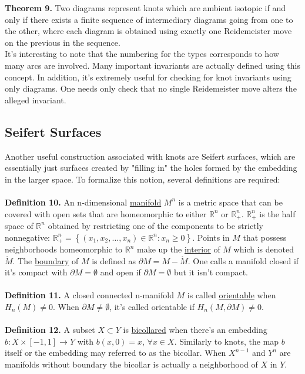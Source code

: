 \documentclass{article}
\begin{document}
\noindent
\textbf{Theorem 9.}  Two diagrams represent knots which are ambient isotopic if and only if there exists a finite sequence of intermediary diagrams going from one to the other, where each diagram is obtained using exactly one Reidemeister move on the previous in the sequence.
\\

\noindent It's interesting to note that the numbering for the types corresponds to how many arcs are involved.  Many important invariants are actually defined using this concept.  In addition, it's extremely useful for checking for knot invariants using only diagrams.  One needs only check that no single Reidemeister move alters the alleged invariant.

\subsection{Seifert Surfaces}
Another useful construction associated with knots are Seifert surfaces, which are essentially just surfaces created by "filling in" the holes formed by the embedding in the larger space.  To formalize this notion, several definitions are required:
\\
\\
\textbf{Definition 10.} An n-dimensional \underline{manifold} $M^n$ is a metric space that can be covered with open sets that are homeomorphic to either $\mathbb{R}^n$ or $\mathbb{R}^n_+$.  $\mathbb{R}^n_+$ is the half space of $\mathbb{R}^n$ obtained by restricting one of the components to be strictly nonnegative: $\mathbb{R}^n_+ = \left\{{(x_1, x_2, \ldots, x_n) \in \mathbb{R}^n : x_n \ge 0}\right\}$. Points in $M$ that possess neighborhoods homeomorphic to $\mathbb{R}^n$ make up the \underline{interior} of $M$ which is denoted $\mathring{M}$.  The \underline{boundary} of $M$ is defined as $\partial M = M - \mathring{M}$. One calls a manifold closed if it's compact with $\partial M = \emptyset$ and open if $\partial M = \emptyset$ but it isn't compact.
\\
\\
\textbf{Definition 11.} A closed connected n-manifold $M$ is called \underline{orientable} when $H_n(M) \neq 0$.  When $\partial M \neq \emptyset$, it's called orientable if $H_n(M, \partial M) \neq 0$.
\\
\\
\textbf{Definition 12.} A subset $X \subset Y$ is \underline{bicollared} when there's an embedding \\ $b: X \times [-1,1] \rightarrow Y$ with $b(x,0) = x$, $\forall x \in X$.  Similarly to knots, the map $b$ itself or the embedding may referred to as the bicollar.  When $X^{n-1}$ and $Y^n$ are manifolds without boundary the bicollar is actually a neighborhood of $X$ in $Y$.
\end{document}
